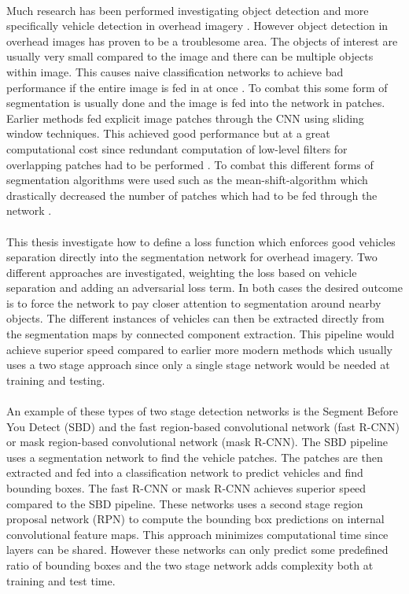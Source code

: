 \documentclass{kththesis}
\begin{document}
\\
Much research has been performed investigating object detection and more specifically vehicle detection in overhead imagery \parencite{ammour_deep_2017, holt_object-based_2009, audebert_segment-before-detect:_2017, razakarivony_vehicle_2015, zhong_robust_2017, audebert_usability_2016, sakla_deep_2017}. However object detection in overhead images has proven to be a troublesome area. The objects of interest are usually very small compared to the image and there can be multiple objects within image. This causes naive classification networks to achieve bad performance if the entire image is fed in at once \parencite{ammour_deep_2017}. To combat this some form of segmentation is usually done and the image is fed into the network in patches. Earlier methods fed explicit image patches through the CNN using sliding window techniques\parencite{holt_object-based_2009}. This achieved good performance but at a great computational cost since redundant computation of low-level filters for overlapping patches had to be performed \parencite{luc_semantic_2016}. To combat this different forms of segmentation algorithms were used such as the mean-shift-algorithm which drastically decreased the number of patches which had to be fed through the network \parencite{ammour_deep_2017}. \\
\\
This thesis investigate how to define a loss function which enforces good vehicles separation directly into the segmentation network for overhead imagery. Two different approaches are investigated, weighting the loss based on vehicle separation and adding an adversarial loss term. In both cases the desired outcome is to force the network to pay closer attention to segmentation around nearby objects. The different instances of vehicles can then be extracted directly from the segmentation maps by connected component extraction. This pipeline would achieve superior speed compared to earlier more modern methods which usually uses a two stage approach since only a single stage network would be needed at training and testing.\\
\\
An example of these types of two stage detection networks is the Segment Before You Detect (SBD) \parencite{audebert_segment-before-detect:_2017} and the fast region-based convolutional network (fast R-CNN) \parencite{ren_faster_2015, girshick_fast_2015} or mask region-based convolutional network (mask R-CNN). The SBD pipeline uses a segmentation network to find the vehicle patches. The patches are then extracted and fed into a classification network to predict vehicles and find bounding boxes. The fast R-CNN or mask R-CNN \parencite{he_mask_2017} achieves superior speed compared to the SBD pipeline. These networks uses a second stage region proposal network (RPN) to compute the bounding box predictions on internal convolutional feature maps. This approach minimizes computational time since layers can be shared. However these networks can only predict some predefined ratio of bounding boxes and the two stage network adds complexity both at training and test time.
\end{document}
